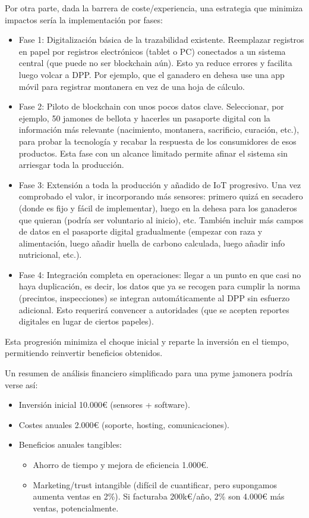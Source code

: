 Por otra parte, dada la barrera de coste/experiencia, una estrategia que minimiza impactos sería la implementación por fases:
\begin{itemize}
    \item Fase 1: Digitalización básica de la trazabilidad existente. Reemplazar registros en papel por registros electrónicos (tablet o PC) conectados a un sistema central (que puede no ser blockchain aún). Esto ya reduce errores y facilita luego volcar a DPP. Por ejemplo, que el ganadero en dehesa use una app móvil para registrar montanera en vez de una hoja de cálculo.
    \item Fase 2: Piloto de blockchain con unos pocos datos clave. Seleccionar, por ejemplo, 50 jamones de bellota y hacerles un pasaporte digital con la información más relevante (nacimiento, montanera, sacrificio, curación, etc.), para probar la tecnología y recabar la respuesta de los consumidores de esos productos. Esta fase con un alcance limitado permite afinar el sistema sin arriesgar toda la producción.
    \item Fase 3: Extensión a toda la producción y añadido de IoT progresivo. Una vez comprobado el valor, ir incorporando más sensores: primero quizá en secadero (donde es fijo y fácil de implementar), luego en la dehesa para los ganaderos que quieran (podría ser voluntario al inicio), etc. También incluir más campos de datos en el pasaporte digital gradualmente (empezar con raza y alimentación, luego añadir huella de carbono calculada, luego añadir info nutricional, etc.).
    \item Fase 4: Integración completa en operaciones: llegar a un punto en que casi no haya duplicación, es decir, los datos que ya se recogen para cumplir la norma (precintos, inspecciones) se integran automáticamente al DPP sin esfuerzo adicional. Esto requerirá convencer a autoridades (que se acepten reportes digitales en lugar de ciertos papeles).
\end{itemize}

Esta progresión minimiza el choque inicial y reparte la inversión en el tiempo, permitiendo reinvertir beneficios obtenidos.

Un resumen de análisis financiero simplificado para una pyme jamonera podría verse así:
\begin{itemize}
    \item Inversión inicial 10.000€ (sensores + software).
    \item Costes anuales 2.000€ (soporte, hosting, comunicaciones).
    \item Beneficios anuales tangibles:
    \begin{itemize}
        \item Ahorro de tiempo y mejora de eficiencia 1.000€.
        \item Marketing/trust intangible (difícil de cuantificar, pero supongamos aumenta ventas en 2\%). Si facturaba 200k€/año, 2\% son 4.000€ más ventas, potencialmente.
    \end{itemize}
\end{itemize}

